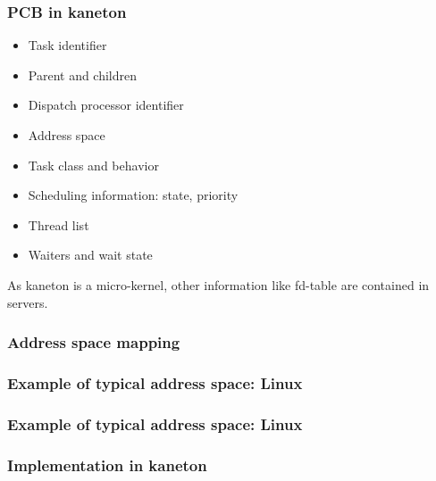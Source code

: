 
\begin{frame}
  \frametitle{PCB in kaneton}

  \begin{itemize}
  \item
    Task identifier
  \item
    Parent and children
  \item
    Dispatch processor identifier
  \item
    Address space
  \item
    Task class and behavior
  \item
    Scheduling information: state, priority
  \item
    Thread list
  \item
    Waiters and wait state
  \end{itemize}

  \-

  As kaneton is a micro-kernel, other information like fd-table are
  contained in servers.

\end{frame}


\begin{frame}
  \frametitle{Address space mapping}
\end{frame}


\begin{frame}
  \frametitle{Example of typical address space: Linux}

  \begin{center}
  \end{center}

\end{frame}


\begin{frame}
  \frametitle{Example of typical address space: Linux}

  \begin{center}
  \end{center}

\end{frame}


\begin{frame}
  \frametitle{Implementation in kaneton}

  \begin{center}
  \end{center}

\end{frame}

